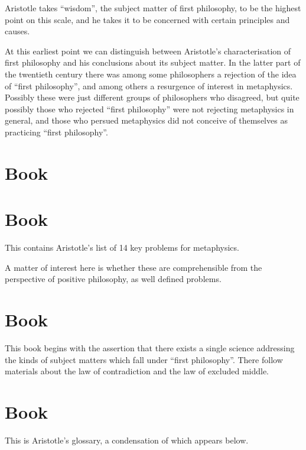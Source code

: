 Aristotle takes ``wisdom'', the subject matter of first philosophy, to be the highest point on this scale, and he takes it to be concerned with certain principles and causes.

At this earliest point we can distinguish between Aristotle's characterisation of first philosophy and his conclusions about its subject matter.
In the latter part of the twentieth century there was among some philosophers a rejection of the idea of ``first philosophy'', and among others a resurgence of interest in metaphysics.
Possibly these were just different groups of philosophers who disagreed, but quite possibly those who rejected ``first philosophy'' were not rejecting metaphysics in general, and those who persued metaphysics did not conceive of themselves as practicing ``first philosophy''.





\section{Book \Rbjalpha}

\section{Book \RbjBeta}

This contains Aristotle's list of 14 key problems for metaphysics.

A matter of interest here is whether these are comprehensible from the perspective of positive philosophy, as well defined problems.

\section{Book \RbjGamma}

This book begins with the assertion that there exists a single science addressing the kinds of subject matters which fall under ``first philosophy''.
There follow materials about the law of contradiction and the law of excluded middle.

\section{Book \RbjDelta}

This is Aristotle's glossary, a condensation of which appears below.

\backmatter


